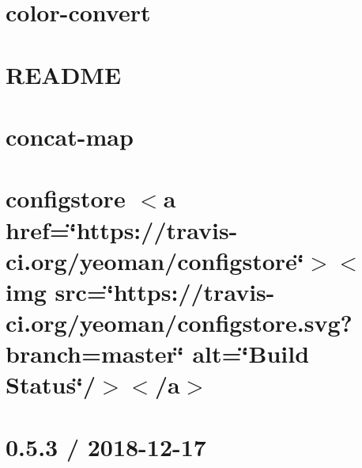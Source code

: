 \let\mypdfximage\pdfximage\def\pdfximage{\immediate\mypdfximage}\documentclass[twoside]{book}
\newcommand{\+}{\discretionary{\mbox{\scriptsize$\hookleftarrow$}}{}{}}
\begin{document}
\chapter{color-\/convert}
\label{md__c_1__git_hub__p_r_o_y_e_c_t_o-_i_i_i-_g_o_t_rest-api_node_modules_color-convert__r_e_a_d_m_e}

\chapter{R\+E\+A\+D\+ME}
\label{md__c_1__git_hub__p_r_o_y_e_c_t_o-_i_i_i-_g_o_t_rest-api_node_modules_color-name__r_e_a_d_m_e}

\chapter{concat-\/map}
\label{md__c_1__git_hub__p_r_o_y_e_c_t_o-_i_i_i-_g_o_t_rest-api_node_modules_concat-map__r_e_a_d_m_e}

\chapter{configstore $<$a href=\char`\"{}https\+://travis-\/ci.\+org/yeoman/configstore\char`\"{}$>$$<$img src=\char`\"{}https\+://travis-\/ci.\+org/yeoman/configstore.\+svg?branch=master\char`\"{} alt=\char`\"{}\+Build Status\char`\"{}/$>$$<$/a$>$}
\label{md__c_1__git_hub__p_r_o_y_e_c_t_o-_i_i_i-_g_o_t_rest-api_node_modules_configstore_readme}

\chapter{0.5.3 / 2018-\/12-\/17}
\label{md__c_1__git_hub__p_r_o_y_e_c_t_o-_i_i_i-_g_o_t_rest-api_node_modules_content-disposition__h_i_s_t_o_r_y}

\end{document}

